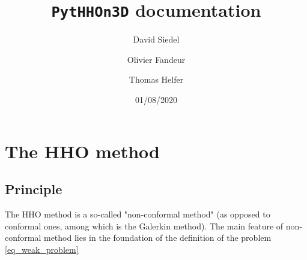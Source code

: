 \documentclass[fleqn]{article}
\title{\texttt{PytHHOn3D} documentation}
\author{David Siedel \and Olivier Fandeur \and  Thomas Helfer}
\date{01/08/2020}
\begin{document}
  \maketitle

  \section{The HHO method}

    \subsection{Principle}

      The HHO method is a so-called "non-conformal method" (as opposed to conformal ones, among which is the Galerkin method). The main feature of non-conformal method lies in the foundation of the definition of the problem \eqref{eq_weak_problem}
\end{document}
